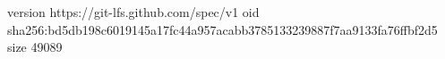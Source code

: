 version https://git-lfs.github.com/spec/v1
oid sha256:bd5db198c6019145a17fc44a957acabb3785133239887f7aa9133fa76ffbf2d5
size 49089
